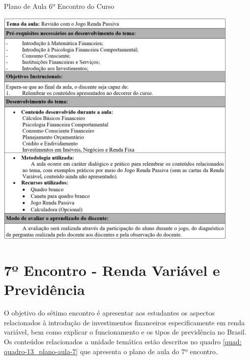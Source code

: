 \graphicspath{{quadros/}} 
\begin{quadro}[!ht]
\centering
\begin{minipage}{1.\textwidth}
\caption{Plano de Aula 6º Encontro do Curso}
\centering
\includegraphics[width=0.9\textwidth]{quadro-12_plano-aula-6}
\label{quad: quadro-12_plano-aula-6}
\end{minipage}
\end{quadro}

\section{7º Encontro - Renda Variável e Previdência}
O objetivo do sétimo encontro é apresentar aos estudantes os aspectos relacionados à introdução de investimentos financeiros especificamente em renda variável, bem como explicar o funcionamento e os tipos de previdência no Brasil. Os conteúdos relacionados a unidade temática estão descritos no quadro \ref{quad: quadro-13_plano-aula-7} que apresenta o plano de aula do 7º encontro.

